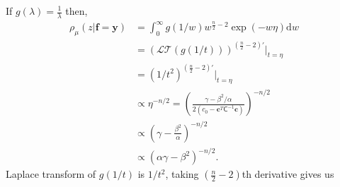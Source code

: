 \documentclass{iitthesis}          %
\newcommand{\bm}[1]{\boldsymbol{#1}}
\newcommand{\D}[1]{\text{d}{#1}}
\newcommand{\vc}{\bm{c}}
\newcommand{\vf}{\bm{f}}
\newcommand{\vy}{\bm{y}}
\newcommand{\mC}{\mathsf{C}}
\begin{document}
If $\displaystyle g(\lambda) = \frac{1}{\lambda}$ then, 
\begin{align*}
{\rho_{\mu}(z | \vf = \vy)} 
&= \int_{0}^\infty g(1/w)  w^{\frac n2 -2}
\exp \left(  - w \eta \right)
\D w
\\
& = \displaystyle \left(\mathcal{LT}(g(1/t)) \right)^{(\frac n2 -2)'} \lvert_{t=\eta}
\\
& = \left(1/t^{2} \right)^{(\frac n2 -2)'} \lvert_{t=\eta}
\\
& \propto \eta^{-n/2} = \left( \frac{  \gamma - \beta^2/\alpha}{2(c_0  -\vc ^T \mC^{-1} \vc)} \right)^{-n/2}
\\
& \propto \left(\gamma - \frac{\beta^2}{\alpha}\right)^{-n/2}
\\
& \propto \left(\alpha \gamma - \beta^2\right)^{-n/2}.
\end{align*}
Laplace transform of $g(1/t)$ is $1/t^2$, taking $(\frac n2 -2)$th derivative gives us 
\end{document}
